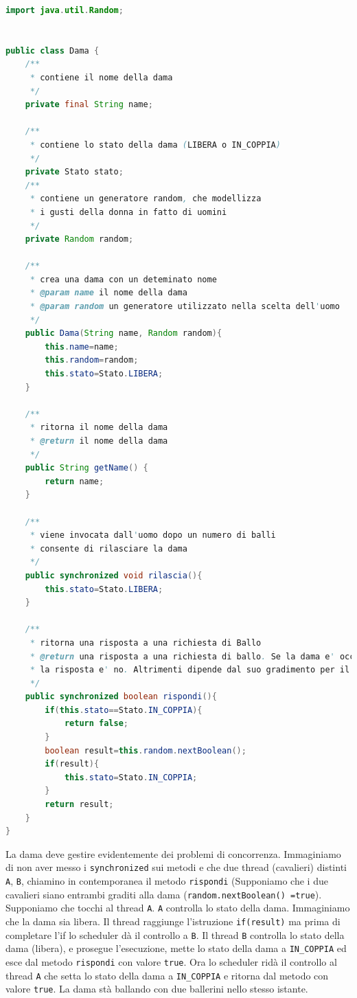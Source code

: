 \documentclass{article}
\begin{document}
\begin{lstlisting}[language=Java]
import java.util.Random;


public class Dama {
	/**
	 * contiene il nome della dama
	 */
	private final String name;
	
	/**
	 * contiene lo stato della dama (LIBERA o IN_COPPIA)
	 */
	private Stato stato;
	/**
	 * contiene un generatore random, che modellizza
	 * i gusti della donna in fatto di uomini
	 */
	private Random random;
	
	/**
	 * crea una dama con un deteminato nome
	 * @param name il nome della dama
	 * @param random un generatore utilizzato nella scelta dell'uomo
	 */
	public Dama(String name, Random random){
		this.name=name;
		this.random=random;
		this.stato=Stato.LIBERA;
	}

	/**
	 * ritorna il nome della dama
	 * @return il nome della dama
	 */
	public String getName() {
		return name;
	}
	
	/**
	 * viene invocata dall'uomo dopo un numero di balli
	 * consente di rilasciare la dama
	 */
	public synchronized void rilascia(){
		this.stato=Stato.LIBERA;
	}
	
	/**
	 * ritorna una risposta a una richiesta di Ballo
	 * @return una risposta a una richiesta di ballo. Se la dama e' occupata
	 * la risposta e' no. Altrimenti dipende dal suo gradimento per il cavaliere
	 */
	public synchronized boolean rispondi(){
		if(this.stato==Stato.IN_COPPIA){
			return false;
		}
		boolean result=this.random.nextBoolean();
		if(result){
			this.stato=Stato.IN_COPPIA;
		}
		return result;
	}
}
\end{lstlisting}
La dama deve gestire evidentemente dei problemi di concorrenza. Immaginiamo di non aver messo i \texttt{synchronized} sui metodi e che due thread (cavalieri) distinti \texttt{A}, \texttt{B}, chiamino in contemporanea il metodo \texttt{rispondi} (Supponiamo che i due cavalieri siano entrambi graditi alla dama (\texttt{random.nextBoolean() =true}). Supponiamo che tocchi al thread \texttt{A}. \texttt{A} controlla lo stato della dama. Immaginiamo che la dama sia libera. Il thread raggiunge l'istruzione \texttt{if(result)} ma prima di completare l'if lo scheduler d\`a il controllo a \texttt{B}. Il thread \texttt{B} controlla lo stato della dama (libera), e prosegue l'esecuzione, mette lo stato della dama a \texttt{IN\_COPPIA} ed esce dal metodo \texttt{rispondi} con valore \texttt{true}. Ora lo scheduler rid\`a il controllo al thread \texttt{A} che setta lo stato della dama a \texttt{IN\_COPPIA} e ritorna dal metodo con valore \texttt{true}. La dama st\`a ballando con due ballerini nello stesso istante.
\end{document}
